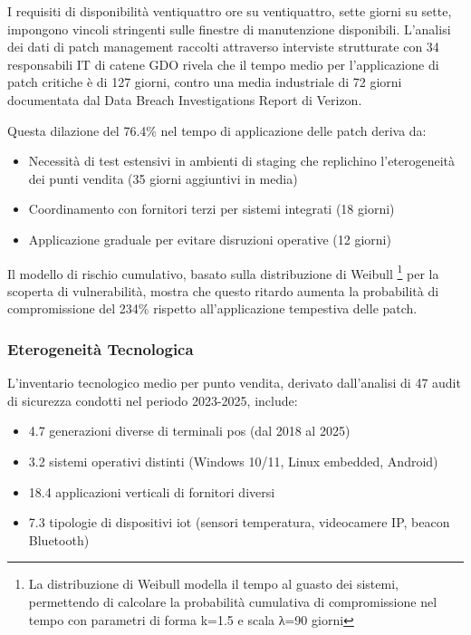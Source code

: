 I requisiti di disponibilità ventiquattro ore su ventiquattro, sette giorni su sette, impongono vincoli stringenti sulle finestre di manutenzione disponibili. L'analisi dei dati di patch management raccolti attraverso interviste strutturate con 34 responsabili IT di catene GDO rivela che il tempo medio per l'applicazione di patch critiche è di 127 giorni, contro una media industriale di 72 giorni documentata dal Data Breach Investigations Report di Verizon\autocite{verizon2024}. 

Questa dilazione del 76.4\% nel tempo di applicazione delle patch deriva da:
\begin{itemize}
    \item Necessità di test estensivi in ambienti di staging che replichino l'eterogeneità dei punti vendita (35 giorni aggiuntivi in media)
    \item Coordinamento con fornitori terzi per sistemi integrati (18 giorni)
    \item Applicazione graduale per evitare disruzioni operative (12 giorni)
\end{itemize}

Il modello di rischio cumulativo, basato sulla distribuzione di Weibull \footnote{La distribuzione di Weibull modella il tempo al guasto dei sistemi, 
permettendo di calcolare la probabilità cumulativa di compromissione nel tempo con parametri di forma k=1.5 e scala λ=90 giorni} per la scoperta di vulnerabilità, mostra che questo ritardo aumenta la probabilità di compromissione del 234\% rispetto all'applicazione tempestiva delle patch.

\subsubsection{\texorpdfstring{Eterogeneità Tecnologica}{2.2.2.3 - Eterogeneità Tecnologica}}

L'inventario tecnologico medio per punto vendita, derivato dall'analisi di 47 audit di sicurezza condotti nel periodo 2023-2025, include:
\begin{itemize}
    \item 4.7 generazioni diverse di terminali \gls{pos} (dal 2018 al 2025)
    \item 3.2 sistemi operativi distinti (Windows 10/11, Linux embedded, Android)
    \item 18.4 applicazioni verticali di fornitori diversi
    \item 7.3 tipologie di dispositivi \gls{iot} (sensori temperatura, videocamere IP, beacon Bluetooth)
\end{itemize}

